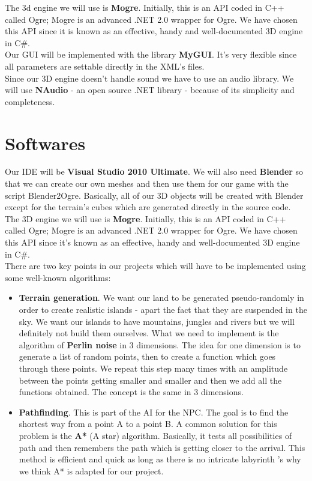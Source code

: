 \documentclass[article]{report} %
\begin{document}
						The 3d engine we will use is \textbf{\ac{Mogre}}. Initially, this is an \ac{API} coded in C++ called Ogre; Mogre is an advanced .NET 2.0 wrapper for Ogre. We have chosen this \ac{API} since it is known as an effective, handy and well-documented 3D engine in C\#.\\			
						Our \ac{GUI} will be implemented with the library \textbf{\ac{MyGUI}}. It’s very flexible since all parameters are settable directly in the XML\textquoteright s files.\\	
						Since our 3D engine doesn\textquoteright t handle sound we have to use an audio library. We will use \textbf{NAudio} - an open source .NET library - because of its simplicity and completeness.
						
						\section{Softwares}
						
							Our \ac{IDE} will be \textbf{Visual Studio 2010 Ultimate}. We will also need \textbf{Blender} so that we can create our own meshes and then use them for our game with the script Blender2Ogre. Basically, all of our 3D objects will be created with Blender except for the terrain\textquoteright s cubes which are generated directly in the source code.
						The 3D engine we will use is \textbf{\ac{Mogre}}. Initially, this is an \ac{API} coded in C++ called Ogre; Mogre is an advanced .NET 2.0 wrapper for Ogre. We have chosen this \ac{API} since it\textquoteright s known as an effective, handy and well-documented 3D engine in C\#.\\		
							
							There are two key points in our projects which will have to be implemented using some well-known algorithms:
							\begin{itemize}
									\item \textbf{Terrain generation}. We want our land to be generated pseudo-randomly in order to create realistic islands - apart the fact that they are suspended in the sky. We want our islands to have mountains, jungles and rivers but we will definitely not build them ourselves. What we need to implement is the algorithm of \textbf{Perlin noise} in 3 dimensions. The idea for one dimension is to generate a list of random points, then to create a function which goes through these points. We repeat this step many times with an amplitude between the points getting smaller and smaller and then we add all the functions obtained. The concept is the same in 3 dimensions.\\

									\item \textbf{Pathfinding}. This is part of the \ac{AI} for the \ac{NPC}. The goal is to find the shortest way from a point A to a point B. A common solution for this problem is the \textbf{A*} (A star) algorithm. Basically, it tests all possibilities of path and then remembers the path which is getting closer to the arrival. This method is efficient and quick as long as there is no intricate labyrinth \textquoteright s why we think A* is adapted for our project.
							\end{itemize}
\end{document}
